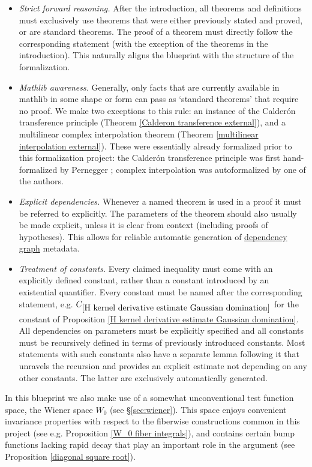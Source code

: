 \documentclass[12pt,reqno]{amsart}
\theoremstyle{plain}
\numberwithin{equation}{section}
\theoremstyle{remark}
\begin{document}
\begin{itemize}
\item {\em Strict forward reasoning.} After the introduction, all theorems and definitions must exclusively use theorems that were either previously stated and proved, or are standard theorems. The proof of a theorem must directly follow the corresponding statement (with the exception of the theorems in the introduction).
This naturally aligns the blueprint with the structure of the formalization.
\item {\em Mathlib awareness.} Generally, only facts that are currently available in mathlib in some shape or form can pass as `standard theorems' that require no proof. 
We make two exceptions to this rule: an instance of the Calder\'on transference principle (Theorem \ref{Calderon transference external}), and a multilinear complex interpolation theorem (Theorem \ref{multilinear interpolation external}). These were essentially already formalized prior to this formalization project: the Calder\'on transference principle was first hand-formalized by Pernegger \cite{Pernegger2025}; complex interpolation was autoformalized by one of the authors.
\item {\em Explicit dependencies.} Whenever a named theorem is used in a proof it must be referred to explicitly. The parameters of the theorem should also usually be made explicit, unless it is clear from context (including proofs of hypotheses). This allows for reliable automatic generation of \href{https://pjroos.com/lean-nct/dependency_graph}{dependency graph} metadata.
\item {\em Treatment of constants.} Every claimed inequality must come with an explicitly defined constant, rather than a constant introduced by an existential quantifier. Every constant must be named after the corresponding statement, e.g. $C_{\ref{H kernel derivative estimate Gaussian domination}}$ for the constant of Proposition \ref{H kernel derivative estimate Gaussian domination}. All dependencies on parameters must be explicitly specified and all constants must be recursively defined in terms of previously introduced constants.
Most statements with such constants also have a separate lemma following it that unravels the recursion and provides an explicit estimate not depending on any other constants. The latter are exclusively automatically generated.
\end{itemize}

In this blueprint we also make use of a somewhat unconventional test function space, the Wiener space $W_0$ (see \S \ref{sec:wiener}). This space enjoys convenient invariance properties with respect to the fiberwise constructions common in this project (see e.g. Proposition \ref{W_0 fiber integrals}), and contains certain bump functions lacking rapid decay that play an important role in the argument (see Proposition \ref{diagonal square root}).
\end{document}
